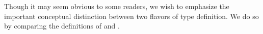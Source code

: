 \begin{code}%
\>[1]\AgdaSpace{}%
\AgdaSymbol{:}\AgdaSpace{}%
\AgdaSymbol{\{}\AgdaSpace{}%
\AgdaSymbol{:}\AgdaSpace{}%
\AgdaSpace{}%
\AgdaSymbol{\}\{}\AgdaSpace{}%
\AgdaSymbol{:}\AgdaSpace{}%
\AgdaSpace{}%
\AgdaSymbol{\}\{}\AgdaSpace{}%
\AgdaSpace{}%
\AgdaSymbol{:}\AgdaSpace{}%
\AgdaSpace{}%
\AgdaSpace{}%
\AgdaSymbol{\}}\AgdaSpace{}%
\AgdaSpace{}%
\AgdaSpace{}%
\AgdaSpace{}%
%
\>[51]%
\>[54]\AgdaSpace{}%
\AgdaSpace{}%
\<%
\\
%
\>[1]\AgdaSpace{}%
\AgdaSpace{}%
\AgdaSymbol{\AgdaUnderscore{}}\AgdaSpace{}%
\AgdaSymbol{=}\AgdaSpace{}%
\<%
\end{code}
\scpad
\begin{code}%
\>[1]\AgdaSpace{}%
\AgdaSymbol{:}\AgdaSpace{}%
\AgdaSymbol{\{}\AgdaSpace{}%
\AgdaSymbol{:}\AgdaSpace{}%
\AgdaSpace{}%
\AgdaSpace{}%
\AgdaSymbol{\}\{}\AgdaSpace{}%
\AgdaSymbol{:}\AgdaSpace{}%
\AgdaSpace{}%
\AgdaSpace{}%
\AgdaSpace{}%
\AgdaSpace{}%
\AgdaSymbol{\}(}\AgdaSpace{}%
\AgdaSpace{}%
\AgdaSymbol{:}\AgdaSpace{}%
\AgdaSpace{}%
\AgdaSymbol{)}\AgdaSpace{}%
\AgdaSpace{}%
\AgdaSpace{}%
\AgdaSpace{}%
\AgdaSpace{}%
\AgdaSpace{}%
\AgdaSpace{}%
\AgdaSpace{}%
\<%
\\
%
\>[1]\AgdaSpace{}%
\AgdaSymbol{\AgdaUnderscore{}}\AgdaSpace{}%
\AgdaSymbol{\AgdaUnderscore{}}\AgdaSpace{}%
\AgdaSpace{}%
\AgdaSymbol{\AgdaUnderscore{}}\AgdaSpace{}%
\AgdaSymbol{=}\AgdaSpace{}%
\<%
\end{code}
\scpad

Though it may seem obvious to some readers, we wish to emphasize the important conceptual distinction between two flavors of type definition.  We do so by comparing the definitions of  and .

